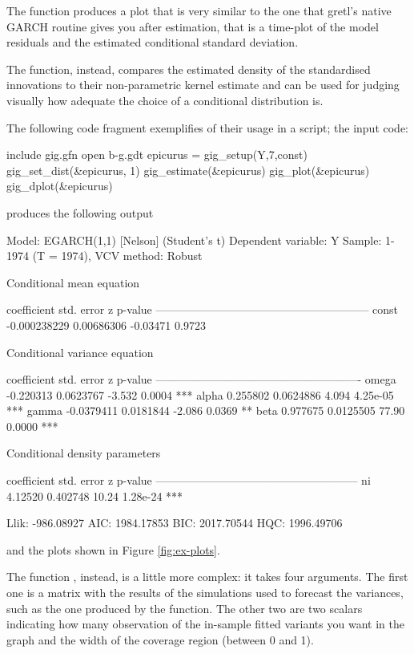 \documentclass[a4paper,11pt]{article}
\newcommand{\dtk}[1]{\texttt{\detokenize{#1}}}
\newcommand{\app}[1]{\textsf{#1}}
\newcounter{script}[section]
\begin{document}
The \dtk{gig_plot} function produces a plot that is very similar to
the one that \app{gretl}'s native GARCH routine gives you after
estimation, that is a time-plot of the model residuals and the
estimated conditional standard deviation.

The \dtk{gig_plot} function, instead, compares the estimated density
of the standardised innovations to their non-parametric kernel
estimate and can be used for judging visually how adequate the choice
of a conditional distribution is.

The following code
fragment exemplifies of their usage in a script; the input code:

\begin{code}
include gig.gfn
open b-g.gdt
epicurus = gig_setup(Y,7,const)
gig_set_dist(&epicurus, 1)
gig_estimate(&epicurus)
gig_plot(&epicurus)
gig_dplot(&epicurus)
\end{code}
produces the following output
\begin{code}
Model: EGARCH(1,1) [Nelson] (Student's t)
Dependent variable: Y
Sample: 1-1974 (T = 1974), VCV method: Robust

    Conditional mean equation

             coefficient    std. error      z       p-value
  ---------------------------------------------------------
  const      -0.000238229   0.00686306   -0.03471   0.9723

    Conditional variance equation

             coefficient   std. error     z      p-value
  -------------------------------------------------------
  omega      -0.220313     0.0623767    -3.532   0.0004   ***
  alpha       0.255802     0.0624886     4.094   4.25e-05 ***
  gamma      -0.0379411    0.0181844    -2.086   0.0369   **
  beta        0.977675     0.0125505    77.90    0.0000   ***

    Conditional density parameters

             coefficient   std. error     z     p-value
  ------------------------------------------------------
  ni           4.12520      0.402748    10.24   1.28e-24 ***

	Llik:   -986.08927	 AIC:   1984.17853
	BIC:    2017.70544	 HQC:   1996.49706
\end{code}
and the plots shown in Figure \ref{fig:ex-plots}.

The function \dtk{gig_vfgraph}, instead, is a little more complex: it
takes four arguments. The first one is a matrix with the results of
the simulations used to forecast the variances, such as the one
produced by the \dtk{gig_var_fcast} function. The other two are two
scalars indicating how many observation of the in-sample fitted
variants you want in the graph and the width of the coverage region
(between 0 and 1).
\end{document}
